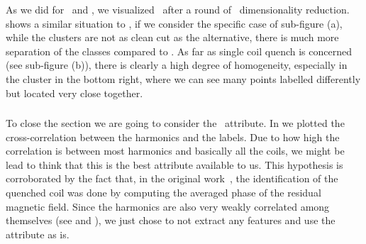 As we did for \an\ and \bn, we visualized \cnmod\ after a round of \pca\ dimensionality reduction.
 shows a similar situation to \an, if we consider the specific case of
sub-figure (a), while the clusters are not as clean cut as the alternative, there is much more
separation of the classes compared to \bn. As far as single coil quench is concerned (see sub-figure
(b)), there is clearly a high degree of homogeneity, especially in the cluster in the bottom right,
where we can see many points labelled differently but located very close together.

\subsubsection{\phin}
To close the section we are going to consider the \phin\ attribute. In  we
plotted the cross-correlation between the harmonics and the labels. Due to how high the correlation
is between most harmonics and basically all the coils, we might be lead to think that this is the
best attribute available to us. This hypothesis is corroborated by the fact that, in the original
work~\cite{mariotto2022}, the identification of the quenched coil was done by computing the averaged
phase of the residual magnetic field. Since the harmonics are also very weakly correlated among themselves
(see  and ), we just chose to not extract any features and use the
attribute as is.
